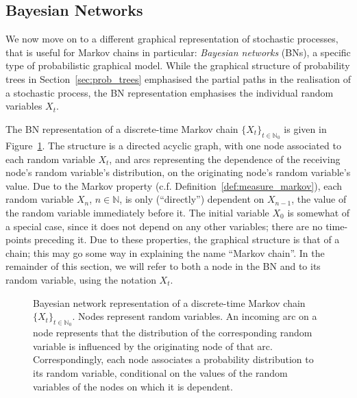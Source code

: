 \documentclass[graybox]{svmult}
\newcommand{\nats}{\mathbb{N}}
\newcommand{\natswith}{\nats_{0}}
\begin{document}
\subsection{Bayesian Networks}\label{sec:pgm}

We now move on to a different graphical representation of stochastic processes, that is useful for Markov chains in particular: \emph{Bayesian networks} (BNs), a specific type of probabilistic graphical model. While the graphical structure of probability trees in Section~\ref{sec:prob_trees} emphasised the partial paths in the realisation of a stochastic process, the BN representation emphasises the individual random variables $X_t$. 

The BN representation of a discrete-time Markov chain $\{X_t\}_{t\in\natswith}$ is given in Figure~\ref{fig:example_markov_pgm}. The structure is a directed acyclic graph, with one node associated to each random variable $X_t$, and arcs representing the dependence of the receiving node's random variable's distribution, on the originating node's random variable's value. Due to the Markov property (c.f. Definition~\ref{def:measure_markov}), each random variable $X_n$, $n\in\nats$, is only (``directly'') dependent on $X_{n-1}$, the value of the random variable immediately before it. The initial variable $X_0$ is somewhat of a special case, since it does not depend on any other variables; there are no time-points preceding it. Due to these properties, the graphical structure is that of a chain; this may go some way in explaining the name ``Markov chain''. In the remainder of this section, we will refer to both a node in the BN and to its random variable, using the notation $X_t$.
\begin{figure}
\centering
{}
\caption{Bayesian network representation of a discrete-time Markov chain $\{X_t\}_{t\in\natswith}$. Nodes represent random variables. An incoming arc on a node represents that the distribution of the corresponding random variable is influenced by the originating node of that arc. Correspondingly, each node associates a probability distribution to its random variable, conditional on the values of the random variables of the nodes on which it is dependent.}
\label{fig:example_markov_pgm}
\end{figure}
\end{document}
